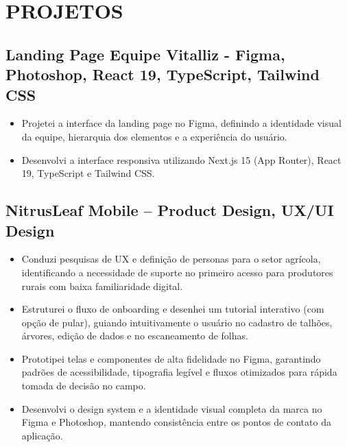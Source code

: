 \documentclass[a4paper,10pt]{article}
\begin{document}
\section{PROJETOS}
    \subsection*{\texorpdfstring{
            \textbf{Landing Page Equipe Vitalliz - Figma, Photoshop, React 19, TypeScript, Tailwind CSS} 
        }{
            Nome da Empresa -- Localização
        }}  
        \begin{itemize} 
            \item Projetei a interface da landing page no Figma, definindo a identidade visual da equipe, hierarquia dos elementos e a experiência do usuário.
            \item Desenvolvi a interface responsiva utilizando Next.js 15 (App Router), React 19, TypeScript e Tailwind CSS.
        \end{itemize}
    
    \subsection*{\texorpdfstring{
            \textbf{NitrusLeaf Mobile -- Product Design, UX/UI Design} 
        }{
            Frutas Wosniak / Projeto Autoral -- São Paulo, SP
        }}  
        \begin{itemize} 
            \item Conduzi pesquisas de UX e definição de personas para o setor agrícola, identificando a necessidade de suporte no primeiro acesso para produtores rurais com baixa familiaridade digital.
            \item Estruturei o fluxo de onboarding e desenhei um tutorial interativo (com opção de pular), guiando intuitivamente o usuário no cadastro de talhões, árvores, edição de dados e no escaneamento de folhas.
            \item Prototipei telas e componentes de alta fidelidade no Figma, garantindo padrões de acessibilidade, tipografia legível e fluxos otimizados para rápida tomada de decisão no campo.
            \item Desenvolvi o design system e a identidade visual completa da marca no Figma e Photoshop, mantendo consistência entre os pontos de contato da aplicação.
        \end{itemize}
\end{document}
